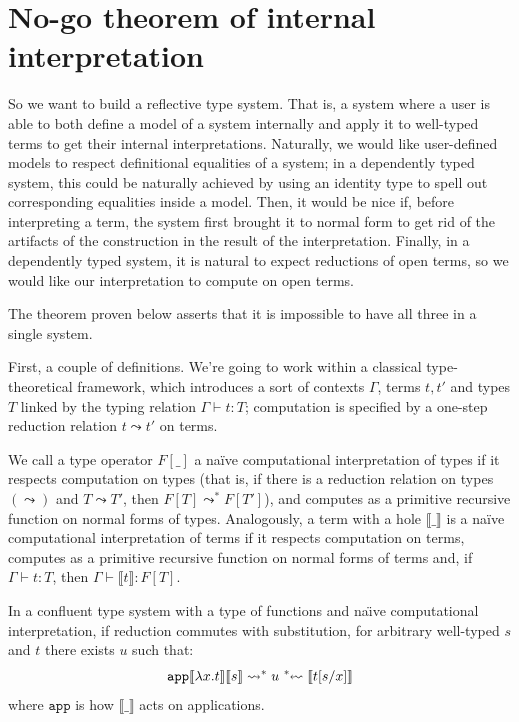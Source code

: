 \section{No-go theorem of internal interpretation}
\label{no-go-section}

So we want to build a reflective type system. That is,
a system where a user is able to both define a model of
a system internally and apply it to well-typed terms to
get their internal interpretations. Naturally, we would
like user-defined models to respect definitional
equalities of a system; in a dependently typed system,
this could be naturally achieved by using an identity
type to spell out corresponding equalities inside a
model. Then, it would be nice if, before interpreting
a term, the system first brought it to normal form to
get rid of the artifacts of the construction in the
result of the interpretation. Finally, in a dependently
typed system, it is natural to expect reductions of open
terms, so we would like our interpretation to compute on
open terms.

The theorem proven below asserts that it is impossible
to have all three in a single system.

First, a couple of definitions. We're going to work
within a classical type-theoretical framework, which
introduces a sort of contexts $\Gamma$, terms $t,t'$ and
types $T$ linked by the typing relation
$\Gamma\vdash t:T$; computation is specified by a
one-step reduction relation $t\leadsto t'$ on terms.

\begin{definition}
    We call a type operator $F[\_]$ a na\"ive
    computational interpretation of types if it
    respects computation on types (that is, if there is
    a reduction relation on types $(\leadsto)$ and
    $T\leadsto T'$, then $F[T]\leadsto^* F[T']$), and
    computes as a primitive recursive function on normal
    forms of types. Analogously, a term with a hole
    $\llbracket\_\rrbracket$ is a na\"ive
    computational interpretation of terms if it
    respects computation on terms, computes as a
    primitive recursive function on normal forms of
    terms and, if $\Gamma\vdash t:T$, then
    $\Gamma\vdash\llbracket t\rrbracket:F[T]$.
\end{definition}

\begin{theorem}
\label{no-go}
    In a confluent type system with a type of functions
    and na\"{\i}ve computational interpretation, if
    reduction commutes with substitution, for arbitrary
    well-typed $s$ and $t$ there exists $u$ such that:
    \[
        \mathtt{app}\llbracket\lambda x.t\rrbracket
        \llbracket s \rrbracket \leadsto^* u\;
        \text{\reflectbox{$\leadsto^*$}}\;
        \llbracket t[s/x] \rrbracket
    \]
    where $\mathtt{app}$ is how $\llbracket\_\rrbracket$
    acts on applications.
\end{theorem}

